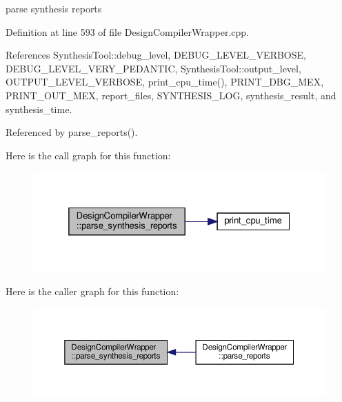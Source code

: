 parse synthesis reports 



Definition at line 593 of file Design\+Compiler\+Wrapper.\+cpp.



References Synthesis\+Tool\+::debug\+\_\+level, D\+E\+B\+U\+G\+\_\+\+L\+E\+V\+E\+L\+\_\+\+V\+E\+R\+B\+O\+SE, D\+E\+B\+U\+G\+\_\+\+L\+E\+V\+E\+L\+\_\+\+V\+E\+R\+Y\+\_\+\+P\+E\+D\+A\+N\+T\+IC, Synthesis\+Tool\+::output\+\_\+level, O\+U\+T\+P\+U\+T\+\_\+\+L\+E\+V\+E\+L\+\_\+\+V\+E\+R\+B\+O\+SE, print\+\_\+cpu\+\_\+time(), P\+R\+I\+N\+T\+\_\+\+D\+B\+G\+\_\+\+M\+EX, P\+R\+I\+N\+T\+\_\+\+O\+U\+T\+\_\+\+M\+EX, report\+\_\+files, S\+Y\+N\+T\+H\+E\+S\+I\+S\+\_\+\+L\+OG, synthesis\+\_\+result, and synthesis\+\_\+time.



Referenced by parse\+\_\+reports().

Here is the call graph for this function\+:
\nopagebreak
\begin{figure}[H]
\begin{center}
\leavevmode
\includegraphics[width=325pt]{d5/d55/classDesignCompilerWrapper_a251f045b7fa693969e0a867f3751f8a5_cgraph}
\end{center}
\end{figure}
Here is the caller graph for this function\+:
\nopagebreak
\begin{figure}[H]
\begin{center}
\leavevmode
\includegraphics[width=350pt]{d5/d55/classDesignCompilerWrapper_a251f045b7fa693969e0a867f3751f8a5_icgraph}
\end{center}
\end{figure}
\mbox{\label{classDesignCompilerWrapper_a909166c0af1cb85b7ac5557add21f67c}} 

